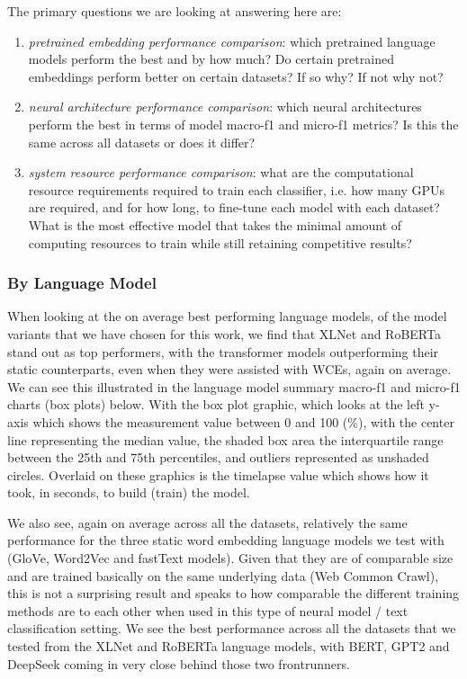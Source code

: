 \documentclass[final]{clv2025-revised}
\begin{document}
The primary questions we are looking at answering here are:
\begin{enumerate}
	\setlength{\itemsep}{0pt}
  	\setlength{\parskip}{0pt}
    \item \textit{pretrained embedding performance comparison}: which pretrained language models perform the best and by how much? Do certain pretrained embeddings perform better on certain datasets? If so why? If not why not?
    \item 	\textit{neural architecture performance comparison}: which neural architectures perform the best in terms of model macro-f1 and micro-f1 metrics? Is this the same across all datasets or does it differ?
    \item \textit{system resource performance comparison}: what are the computational resource requirements required to train each classifier, i.e. how many GPUs are required, and for how long, to fine-tune each model with each dataset? What is the most effective model that takes the minimal amount of computing resources to train while still retaining competitive results?
\end{enumerate}


\subsubsection{By Language Model} 

When looking at the on average best performing language models, of the model variants that we have chosen for this work, we find that XLNet and RoBERTa stand out as top performers, with the transformer models outperforming their static counterparts, even when they were assisted with WCEs, again on average. We can see this illustrated in the language model summary macro-f1 and micro-f1 charts (box plots) below. With the box plot graphic, which looks at the left y-axis which shows the measurement value between 0 and 100 (\%), with the center line representing the median value, the shaded box area the interquartile range between the 25th and 75th percentiles, and outliers represented as unshaded circles. Overlaid on these graphics is the timelapse value which shows how it took, in seconds, to build (train) the model.

We also see, again on average across all the datasets, relatively the same performance for the three static word embedding language models we test with (GloVe, Word2Vec and fastText models). Given that they are of comparable size and are trained basically on the same underlying data (Web Common Crawl), this is not a surprising result and speaks to how comparable the different training methods are to each other when used in this type of neural model / text classification setting. We see the best performance across all the datasets that we tested from the XLNet and RoBERTa language models, with BERT, GPT2 and DeepSeek coming in very close behind those two frontrunners. 
\end{document}
